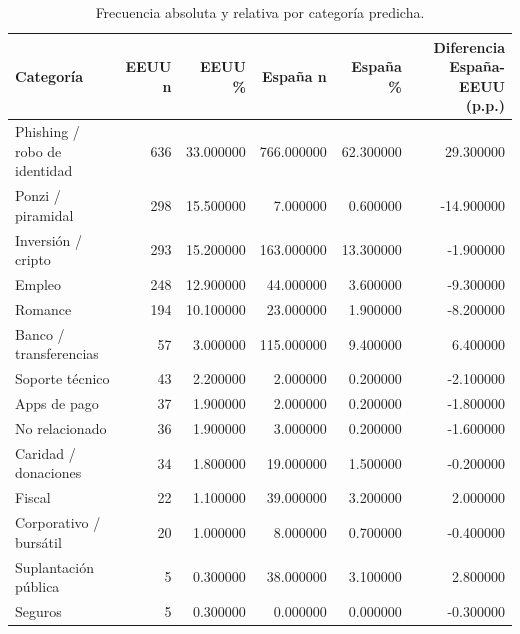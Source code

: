 \begin{table}
\caption{Frecuencia absoluta y relativa por categoría predicha.}
\label{tab:distribucion_categorias}
\begin{tabular}{lrrrrr}
\toprule
Categoría & EEUU n & EEUU \% & España n & España \% & Diferencia España-EEUU (p.p.) \\
\midrule
Phishing / robo de identidad & 636 & 33.000000 & 766.000000 & 62.300000 & 29.300000 \\
Ponzi / piramidal & 298 & 15.500000 & 7.000000 & 0.600000 & -14.900000 \\
Inversión / cripto & 293 & 15.200000 & 163.000000 & 13.300000 & -1.900000 \\
Empleo & 248 & 12.900000 & 44.000000 & 3.600000 & -9.300000 \\
Romance & 194 & 10.100000 & 23.000000 & 1.900000 & -8.200000 \\
Banco / transferencias & 57 & 3.000000 & 115.000000 & 9.400000 & 6.400000 \\
Soporte técnico & 43 & 2.200000 & 2.000000 & 0.200000 & -2.100000 \\
Apps de pago & 37 & 1.900000 & 2.000000 & 0.200000 & -1.800000 \\
No relacionado & 36 & 1.900000 & 3.000000 & 0.200000 & -1.600000 \\
Caridad / donaciones & 34 & 1.800000 & 19.000000 & 1.500000 & -0.200000 \\
Fiscal & 22 & 1.100000 & 39.000000 & 3.200000 & 2.000000 \\
Corporativo / bursátil & 20 & 1.000000 & 8.000000 & 0.700000 & -0.400000 \\
Suplantación pública & 5 & 0.300000 & 38.000000 & 3.100000 & 2.800000 \\
Seguros & 5 & 0.300000 & 0.000000 & 0.000000 & -0.300000 \\
\bottomrule
\end{tabular}
\end{table}
